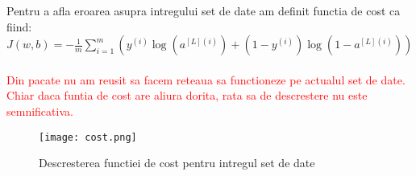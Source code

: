 Pentru a afla eroarea asupra intregului set de date am definit functia de cost ca fiind:
$ J(w, b) = - \frac{1}{m} \sum_{i=1}^{m} \left( y^{(i)} \log{\left( a^{[L](i)} \right)} + \left( 1 - y^{(i)} \right) \log{ \left( 1 - a^{[L](i)} \right)} \right)$ \\ \\



\textcolor{red}{Din pacate nu am reusit sa facem reteaua sa functioneze pe 
actualul set de date.  Chiar daca funtia de cost are aliura dorita, rata sa
de descrestere nu este semnificativa.}


\begin{figure}[H]
	\texttt{[image: cost.png]}
	\centering
	\caption{Descresterea functiei de cost pentru intregul set de date}
\end{figure}
